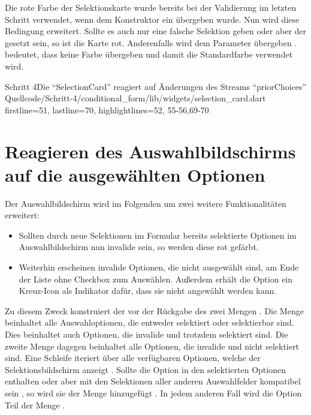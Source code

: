 Die rote Farbe der Selektionskarte wurde bereits bei der Validierung im letzten Schritt verwendet,
wenn dem Konstruktor ein  übergeben wurde.
Nun wird diese Bedingung erweitert.
Sollte es auch nur eine falsche Selektion geben
oder aber der  gesetzt sein,
so ist die Karte rot.
Anderenfalls wird dem Parameter   übergeben .
 bedeutet, dass keine Farbe übergeben und damit die Standardfarbe verwendet wird.

\begin{alexlisting}{Schritt 4}{Die \enquote{SelectionCard} reagiert auf Änderungen des Streams \enquote{priorChoices}}
  {Quellcode/Schritt-4/conditional_form/lib/widgets/selection_card.dart}
  {firstline=51, lastline=70, highlightlines={52, 55-56,69-70}}
  \label{lst:Schritt4StreamBuilderpriorChoices}
\end{alexlisting} 

\clearpage
\section{Reagieren des Auswahlbildschirms auf die ausgewählten Optionen}



Der Auswahlbildschirm wird im Folgenden um zwei weitere Funktionalitäten erweitert:
\begin{itemize}[topsep=0pt,itemsep=-1ex,partopsep=1ex,parsep=1ex]
  \item Sollten durch neue Selektionen im Formular bereits selektierte Optionen im Auswahlbildschirm nun invalide sein,
  so werden diese rot gefärbt.
  \item Weiterhin erscheinen invalide Optionen,
  die nicht ausgewählt sind,
  am Ende der Liste ohne Checkbox zum Auswählen.
  Außerdem erhält die Option ein Kreuz-Icon als Indikator dafür,
  dass sie nicht angewählt werden kann.
\end{itemize}




Zu diesem Zweck konstruiert der  vor der Rückgabe des  zwei Mengen \Lst{\ref{lst:Schritt4selectedAndSelectableChoices}}.
Die Menge   beinhaltet alle Auswahloptionen,
die entweder selektiert oder selektierbar sind.
Dies beinhaltet auch Optionen,
die invalide und trotzdem selektiert sind.
Die zweite Menge   dagegen beinhaltet alle Optionen,
die invalide
und nicht selektiert sind.
Eine Schleife iteriert über alle verfügbaren Optionen,
welche der Selektionsbildschirm anzeigt  .
Sollte die Option in den selektierten Optionen enthalten 
oder aber mit den Selektionen aller anderen Auswahlfelder kompatibel sein ,
so wird sie der Menge  hinzugefügt .
In jedem anderen Fall wird die Option Teil der Menge  .

